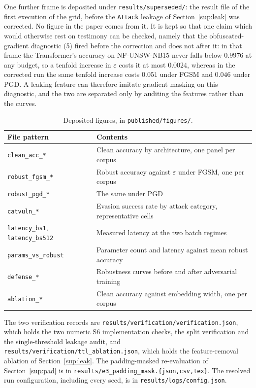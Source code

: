 \documentclass[11pt,a4paper]{article}
\begin{document}
One further frame is deposited under
\texttt{results/superseded/}: the result file of the first execution of
the grid, before the \texttt{Attack} leakage of
Section~\ref{sup:leak} was corrected. No figure in the paper comes from
it. It is kept so that one claim which would otherwise rest on
testimony can be checked, namely that the obfuscated-gradient
diagnostic (5) fired before the correction and does not after it: in
that frame the Transformer's accuracy on NF-UNSW-NB15 never falls below
$0.9976$ at any budget, so a tenfold increase in $\varepsilon$ costs it
at most $0.0024$, whereas in the corrected run the same tenfold
increase costs $0.051$ under FGSM and $0.046$ under PGD. A leaking
feature can therefore imitate gradient masking on this diagnostic, and
the two are separated only by auditing the features rather than the
curves.

\begin{table}[h]
\centering
\caption{Deposited figures, in \texttt{published/figures/}.}
\small
\begin{tabular}{@{}l p{}@{}}
\toprule
File pattern & Contents \\
\midrule
\texttt{clean\_acc\_*}   & Clean accuracy by architecture, one panel per corpus \\
\texttt{robust\_fgsm\_*} & Robust accuracy against $\varepsilon$ under FGSM, one per corpus \\
\texttt{robust\_pgd\_*}  & The same under PGD \\
\texttt{catvuln\_*}      & Evasion success rate by attack category, representative cells \\
\texttt{latency\_bs1}, \texttt{latency\_bs512} & Measured latency at the two batch regimes \\
\texttt{params\_vs\_robust} & Parameter count and latency against mean robust accuracy \\
\texttt{defense\_*}      & Robustness curves before and after adversarial training \\
\texttt{ablation\_*}     & Clean accuracy against embedding width, one per corpus \\
\bottomrule
\end{tabular}
\end{table}

\noindent
The two verification records are
\texttt{results/verification/verification.json}, which holds the two numeric
S6 implementation checks, the split verification and the
single-threshold leakage audit, and
\texttt{results/verification/ttl\_ablation.json}, which holds the
feature-removal ablation of Section~\ref{sup:leak}. The padding-masked
re-evaluation of Section~\ref{sup:pad} is in
\texttt{results/e3\_padding\_mask.\{json,csv,tex\}}. The resolved run
configuration, including every seed, is in
\texttt{results/logs/config.json}.
\end{document}
